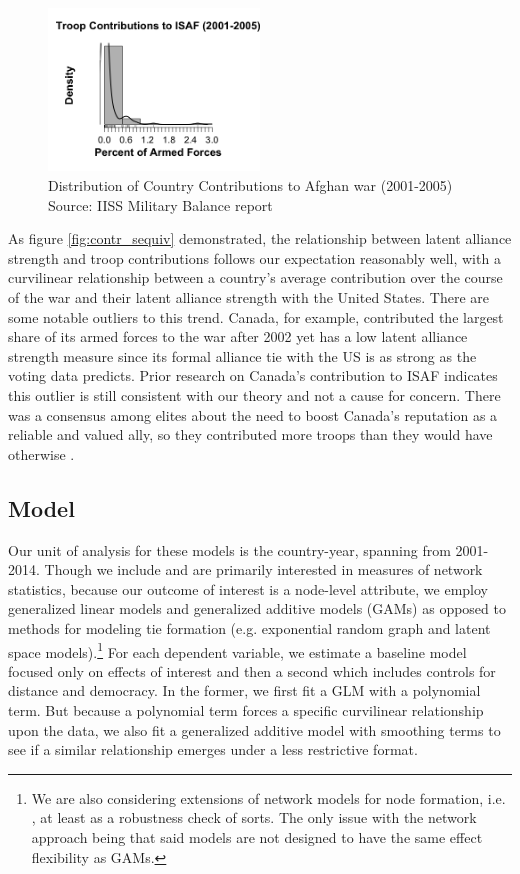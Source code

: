 \documentclass[12pt,letterpaper]{article}
\begin{document}
		\begin{figure}[ht]
			\centering
			\includegraphics[width=0.5\textwidth]{figures/troops_hist_largebin.png}
			\caption{Distribution of Country Contributions to Afghan war (2001-2005) Source: IISS Military Balance report}
			\label{fig:troop_hist}
		\end{figure}
		
		As figure \ref{fig:contr_sequiv} demonstrated, the relationship between latent alliance strength and troop contributions follows our expectation reasonably well, with a curvilinear relationship between a country's average contribution over the course of the war and their latent alliance strength with the United States. There are some notable outliers to this trend. Canada, for example, contributed the largest share of its armed forces to the war after 2002 yet has a low latent alliance strength measure since its formal alliance tie with the US is as strong as the voting data predicts. Prior research on Canada's contribution to ISAF indicates this outlier is still consistent with our theory and not a cause for concern. There was a consensus among elites about the need to boost Canada's reputation as a reliable and valued ally, so they contributed more troops than they would have otherwise \citep{massie_alliancevaluestatus_2018}.
		
	\subsection{Model}
		Our unit of analysis for these models is the country-year, spanning from 2001-2014. Though we include and are primarily interested in measures of network statistics, because our outcome of interest is a node-level attribute, we employ generalized linear models and generalized additive models (GAMs) as opposed to methods for modeling tie formation (e.g. exponential random graph and latent space models).\footnote{We are also considering extensions of network models for node formation, i.e. \citet{fosdick_testingmodelingdependencies_2015}, at least as a robustness check of sorts. The only issue with the network approach being that said models are not designed to have the same effect flexibility as GAMs.} For each dependent variable, we estimate a baseline model focused only on effects of interest and then a second which includes controls for distance and democracy. In the former, we first fit a GLM with a polynomial term. But because a polynomial term forces a specific curvilinear relationship upon the data, we also fit a generalized additive model with smoothing terms to see if a similar relationship emerges under a less restrictive format.
\end{document}
